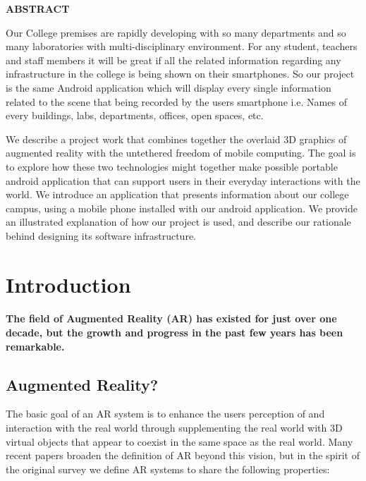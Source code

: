 \documentclass{article}
\begin{document}
\newpage
\begin{center}
{\LARGE \textbf{ ABSTRACT}}\\[1cm]
\end{center}
{\large
	\par Our College premises are rapidly developing with so many departments and so many laboratories with multi-disciplinary environment. For any student, teachers and staff members it will be great if all the related information regarding any infrastructure in the college is being shown on their smartphones. So our project is the same Android application which will display every single information related to the scene that being recorded by the users smartphone i.e. Names of every buildings, labs, departments, offices, open spaces, etc. 
	\par We describe a project work that combines together the overlaid 3D graphics of augmented reality with the untethered freedom of mobile computing. The goal is to explore how these two technologies might together make possible portable android application that can support users in their everyday interactions with the world. We introduce an application that presents information about our college campus, using a mobile phone installed with our android application. We provide an illustrated explanation of how our project is used, and describe our rationale behind designing its software infrastructure.
} 



\newpage
\normalsize
\section{Introduction}
\paragraph{ The field of Augmented Reality (AR) has existed for just over one decade, but the growth and progress in the past few years has been remarkable. }
\subsection{Augmented Reality?}
\par The basic goal of an AR system is to enhance the users perception of and interaction with the real world through supplementing the real world with 3D virtual objects that appear to coexist in the same space as the real world.  Many recent papers broaden the definition of AR beyond this vision, but in the spirit of the original survey we define AR systems to share the following properties: 
\end{document}
